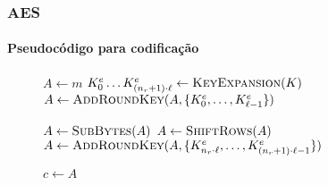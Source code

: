 \documentclass[12pt]{beamer}
\begin{document}
\begin{frame}
    \footnotesize
    \frametitle{AES}
    \framesubtitle{Pseudocódigo para codificação}
    \begin{figure}[ht]
      \centering
      \begin{minipage}{.7\linewidth}
        \begin{algorithm}[H]
        
            $A \leftarrow m$\;
            $K^{e}_{0} \dots K^{e}_{(n_r + 1) \cdot \ell}
                \leftarrow \textsc{KeyExpansion}(K)$\;
            $A \leftarrow \textsc{AddRoundKey}(A,
                \{K^{e}_{0}, \dots, K^{e}_{\ell - 1}\})$\;
            
         
            $A \leftarrow \textsc{SubBytes}(A)$\;
            $A \leftarrow \textsc{ShiftRows}(A)$\;
            $A \leftarrow \textsc{AddRoundKey}(A,
                \{K^{e}_{n_r \cdot \ell}, \dots, K^{e}_{(n_r + 1) \cdot \ell - 1}\})$\;
        
            $c \leftarrow A$\;
        \end{algorithm}
      \end{minipage}
    \end{figure}
\end{frame}
\end{document}
